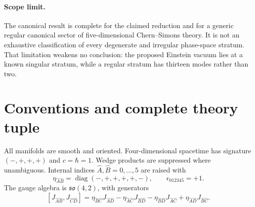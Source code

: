 \documentclass[11pt,a4paper]{article}
\theoremstyle{definition}
\theoremstyle{remark}
\newcommand{\Lie}[1]{\mathfrak{#1}}
\begin{document}
\paragraph{Scope limit.}
The canonical result is complete for the claimed reduction and for a generic regular canonical sector of five-dimensional Chern--Simons theory.  It is not an exhaustive classification of every degenerate and irregular phase-space stratum.  That limitation weakens no conclusion: the proposed Einstein vacuum lies at a known singular stratum, while a regular stratum has thirteen modes rather than two.

\section{Conventions and complete theory tuple}

All manifolds are smooth and oriented.  Four-dimensional spacetime has signature $(-,+,+,+)$ and $c=\hbar=1$.  Wedge products are suppressed where unambiguous.  Internal indices $\widehat A,\widehat B=0,\ldots,5$ are raised with
\[
\eta_{\widehat A\widehat B}=\operatorname{diag}(-,+,+,+,+,-),
\qquad
\epsilon_{012345}=+1.
\]
The gauge algebra is $\Lie{so}(4,2)$, with generators
\[
[J_{\widehat A\widehat B},J_{\widehat C\widehat D}]
=\eta_{\widehat B\widehat C}J_{\widehat A\widehat D}
-\eta_{\widehat A\widehat C}J_{\widehat B\widehat D}
-\eta_{\widehat B\widehat D}J_{\widehat A\widehat C}
+\eta_{\widehat A\widehat D}J_{\widehat B\widehat C}.
\]
\end{document}
